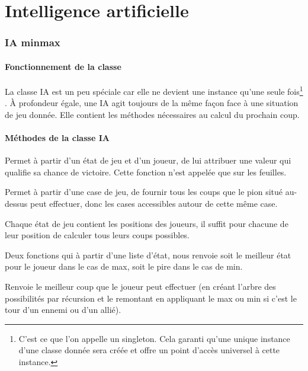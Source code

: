 \documentclass[11pt,a4paper]{article}
\begin{document}
\newpage

\part{Intelligence artificielle}

\setcounter{section}{0}

\section{IA minmax}

\subsection{Fonctionnement de la classe}

La classe IA est un peu spéciale car elle ne devient une instance qu'une seule fois\footnote{C'est ce que l'on appelle un singleton. Cela garanti qu'une unique instance d'une classe donnée sera créée et offre un point d'accès universel à cette instance.} . À profondeur égale, une IA agit toujours de la même façon face à une situation de jeu donnée. Elle contient les méthodes nécessaires au calcul du prochain coup.

\subsection{Méthodes de la classe IA}

\begin{description}[itemsep=5pt]

    \item[eval:] Permet à partir d'un état de jeu et d'un joueur, de lui attribuer une valeur qui qualifie sa chance de victoire. Cette fonction n'est appelée que sur les feuilles.
    
   \item[simulerCoupDePosition:] Permet à partir d'une case de jeu, de fournir tous les coups que le pion situé au-dessus peut effectuer, donc les cases accessibles autour de cette même case.
    
    \item[simulerTousLesCoups:] Chaque état de jeu contient les positions des joueurs, il suffit pour chacune de leur position de calculer tous leurs coups possibles.

    \item[min et max:] Deux fonctions qui à partir d'une liste d'état, nous renvoie soit le meilleur état pour le joueur dans le cas de max, soit le pire dans le cas de min.
    
    \item[minimax:] Renvoie le meilleur coup que le joueur peut effectuer (en créant l'arbre des possibilités par récursion et le remontant en appliquant le max ou min si c'est le tour d'un ennemi ou d'un allié).
\end{description}
\end{document}
